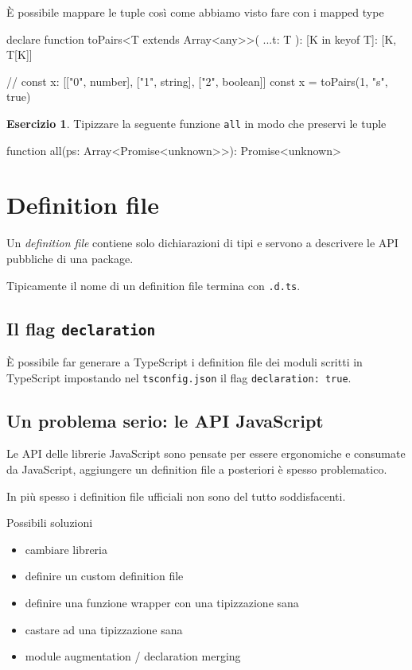 \documentclass[12pt]{article}
\theoremstyle{definition}
\newtheorem{exercise}{Esercizio}[subsection]
\newenvironment{code}
  {\vspace{0.5cm} \VerbatimEnvironment\begin{typescriptcode}}
  {\end{typescriptcode} \vspace{0.2cm}}
\begin{document}
È possibile mappare le tuple così come abbiamo visto fare con i mapped type

\begin{code}
declare function toPairs<T extends Array<any>>(
  ...t: T
): { [K in keyof T]: [K, T[K]] }

// const x: [["0", number], ["1", string], ["2", boolean]]
const x = toPairs(1, "s", true)
\end{code}

\begin{exercise}
Tipizzare la seguente funzione \texttt{all} in modo che preservi le tuple

\begin{code}
function all(ps: Array<Promise<unknown>>): Promise<unknown>
\end{code}
\end{exercise}

\newpage
\section{Definition file}

Un \emph{definition file} contiene solo dichiarazioni di tipi e servono a descrivere le API pubbliche di una package.

Tipicamente il nome di un definition file termina con \texttt{.d.ts}.

\subsection{Il flag \texttt{declaration}}

È possibile far generare a TypeScript i definition file dei moduli scritti in TypeScript impostando nel \texttt{tsconfig.json}
il flag \texttt{declaration: true}.

\subsection{Un problema serio: le API JavaScript}

Le API delle librerie JavaScript sono pensate per essere ergonomiche e consumate da JavaScript,
aggiungere un definition file a posteriori è spesso problematico.

In più spesso i definition file ufficiali non sono del tutto soddisfacenti.

Possibili soluzioni

\begin{itemize}
\item cambiare libreria
\item definire un custom definition file
\item definire una funzione wrapper con una tipizzazione sana
\item castare ad una tipizzazione sana
\item module augmentation / declaration merging
\end{itemize}
\end{document}
